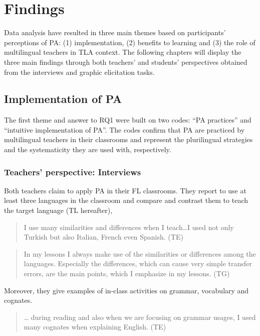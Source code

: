 \documentclass[output=paper]{../langscibook}
\begin{document}
\section{Findings}


Data analysis have resulted in three main themes based on participants’ perceptions of PA: (1) implementation, (2) benefits to learning and (3) the role of multilingual teachers in TLA context. The following chapters will display the three main findings through both teachers’ and students’ perspectives obtained from the interviews and graphic elicitation tasks.



\subsection{Implementation of PA}
\label{sec:kucukali:1}


The first theme and answer to RQ1 were built on two codes: “PA practices” and “intuitive implementation of PA”. The codes confirm that PA are practiced by multilingual teachers in their classrooms and represent the plurilingual strategies and the systematicity they are used with, respectively.


\subsubsection{Teachers’ perspective: Interviews}


Both teachers claim to apply PA in their FL classrooms. They report to use at least three languages in the classroom and compare and contrast them to teach the target language (TL hereafter),

\begin{quote}
I use many similarities and differences when I teach…I used not only Turkish but also Italian, French even Spanish. (TE) 
\end{quote}

\begin{quote}
In my lessons I always make use of the similarities or differences among the languages. Especially the differences, which can cause very simple transfer errors, are the main points, which I emphasize in my lessons. (TG) 
\end{quote}

\noindent Moreover, they give examples of in-class activities on grammar, vocabulary and cognates. 

\begin{quote}
… during reading and also when we are focusing on grammar usages, I used many cognates when explaining English. (TE) 
\end{quote}
\end{document}
